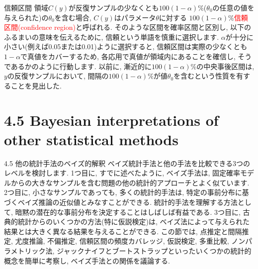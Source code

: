 \documentclass[10pt,dvipdfmx,a4]{beamer}
\newcommand{\tcr}[1]{\textcolor{red}{#1}}
\begin{document}

\begin{frame}{信頼区間}
領域$C(y)$が反復サンプルの少なくとも$100(1-\alpha)\%$($\theta_0$の任意の値を与えられた)の$\theta_0$を含む場合, $C(y)$はパラメータ$\theta$に対する $100(1-\alpha)\%$\tcr{信頼区間(confidence region)}と呼ばれる.
そのような区間を確率区間と区別し, 以下のふるまいの意味を伝えるために, 信頼という単語を慎重に選択します.
$\alpha$が十分に小さい(例えば0.05または0.01)ように選択すると, 信頼区間は実際の少なくとも$1-\alpha$で真値をカバーするため, 各応用で真値が領域内にあることを確信し, そうであるかのように行動します.
以前に, 漸近的に$100(1- \alpha)\%$の中央事後区間は, $y$の反復サンプルにおいて, 間隔の$100(1-\alpha)\%$が値$\theta_0$を含むという性質を有することを見出した.
\end{frame}

\section{4.5 Bayesian interpretations of other statistical methods}
\begin{frame}{4.5 他の統計手法のベイズ的解釈}
ベイズ統計手法と他の手法を比較できる3つのレベルを検討します.
1つ目に, すでに述べたように, ベイズ手法は, 固定確率モデルからの大きなサンプルを含む問題の他の統計的アプローチとよく似ています.
2つ目に, 小さなサンプルであっても, 多くの統計的手法は, 特定の事前分布に基づくベイズ推論の近似値とみなすことができる.
統計的手法を理解する方法として, 暗黙の潜在的な事前分布を決定することはしばしば有益である.
3つ目に, 古典的統計からのいくつかの方法(特に仮説検定)は, ベイズ法によって与えられた結果とは大きく異なる結果を与えることができる.
この節では, 点推定と間隔推定, 尤度推論, 不偏推定, 信頼区間の頻度カバレッジ, 仮説検定, 多重比較, ノンパラメトリック法, ジャックナイフとブートストラップといったいくつかの統計的概念を簡単に考察し, ベイズ手法との関係を議論する.
\end{frame}

\end{document}
